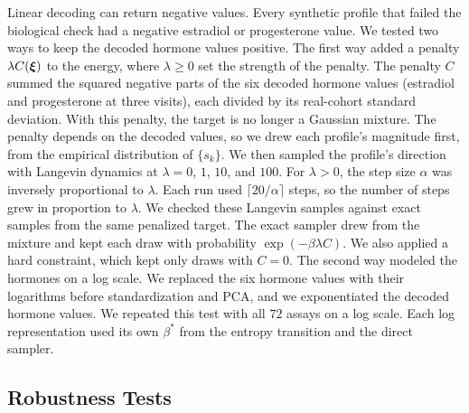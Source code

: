Linear decoding can return negative values. Every synthetic profile that failed the
biological check had a negative estradiol or progesterone value. We tested two ways to keep
the decoded hormone values positive. The first way added a penalty $\lambda C(\boldsymbol{\xi})$ to
the energy, where $\lambda\ge0$ set the strength of the penalty. The penalty $C$ summed the
squared negative parts of the six decoded hormone values (estradiol and progesterone at three
visits), each divided by its real-cohort standard deviation. With this penalty, the target is
no longer a Gaussian mixture. The penalty depends on the decoded
values, so we drew each profile's magnitude first, from the empirical distribution of
$\{s_k\}$. We then sampled the profile's direction with Langevin dynamics at $\lambda=0$, $1$,
$10$, and $100$. For $\lambda>0$, the step size $\alpha$ was inversely proportional to $\lambda$. Each run
used $\lceil 20/\alpha\rceil$ steps, so the number of steps grew in proportion to $\lambda$. We checked these Langevin samples against exact samples from the
same penalized target. The exact sampler drew from the mixture and kept each draw with
probability $\exp(-\beta\lambda C)$. We also applied a hard constraint, which kept only draws
with $C=0$. The second way modeled the hormones on a log scale. We replaced the six hormone
values with their logarithms before standardization and PCA, and we exponentiated the decoded
hormone values. We repeated this test with all $72$ assays on a log scale. Each log
representation used its own $\beta^*$ from the entropy transition and the direct sampler.

\subsection{Robustness Tests}
\label{sec:robustness-benchmarks}

